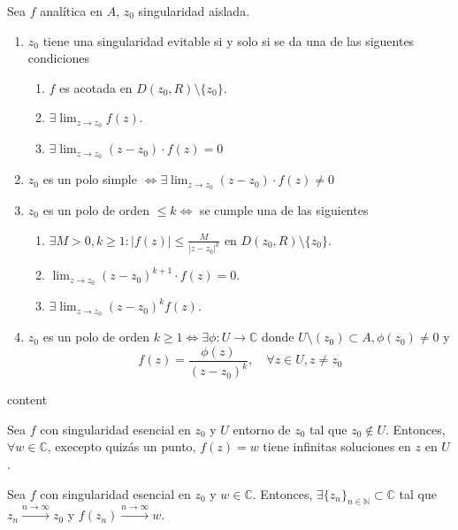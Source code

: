 \begin{prop}
  Sea $f$ analítica en $A$, $z_{0}$ singularidad aislada.
  \begin{enumerate}[label=(\roman*)]
    \item $z_{0}$ tiene una singularidad evitable si y solo si se da una de las siguentes condiciones
      \begin{enumerate}
        \item $f$ es acotada en $D(z_{0}, R) \setminus \{ z_{0} \}$.
        \item $\exists \lim_{z \to z_{0}} f(z)$.
        \item $\exists \lim_{z \to z_{0}} (z - z_{0}) \cdot f(z) = 0$
      \end{enumerate}
    \item $z_{0}$ es un polo simple $\Leftrightarrow \exists \lim_{z \to z_{0}} (z - z_{0}) \cdot f(z) \neq 0$
    \item $z_{0}$ es un polo de orden $\leq k \Leftrightarrow$ se cumple una de las siguientes
      \begin{enumerate}
        \item $\exists M > 0, k \geq 1 : | f(z) | \leq \frac{M}{| z -z_{0} |^{k}}$ en $D(z_{0}, R) \setminus \{ z_{0} \}$.
        \item $\lim_{z \to z_{0}} (z - z_{0})^{k+1} \cdot f(z) = 0$.
        \item $\exists \lim_{z \to z_{0}} (z -z_{0})^{k} f(z)$.
      \end{enumerate}
    \item $z_{0}$ es un polo de orden $k \geq 1 \Leftrightarrow \exists \phi : U \to \mathbb{C}$ donde $U \setminus (z_{0}) \subset A, \phi(z_{0}) \neq 0$ y
      \[ 
        f(z) = \frac{\phi(z)}{(z -z_{0})^{k}}, \quad \forall z \in U, z \neq z_{0}
      \] 
  \end{enumerate}
\end{prop}

\begin{dem}
  content
\end{dem}

\begin{theo}[de Picard]
  Sea $f$ con singularidad esencial en $z_{0}$ y $U$ entorno de $z_{0}$ tal que $z_{0} \not \in U$. Entonces, $\forall w \in \mathbb{C}$, execepto quizás un punto, $f(z) = w$ tiene infinitas soluciones en $z$ en $U$.
\end{theo}

\begin{theo}
  Sea $f$ con singularidad esencial en $z_{0}$ y $w \in \mathbb{C}$. Entonces, $\exists \{ z_{n} \}_{n \in \mathbb{N}} \subset \mathbb{C}$ tal que $z_{n} \xrightarrow[]{ n \rightarrow \infty } z_{0}$ y $f(z_{n}) \xrightarrow[]{ n \rightarrow \infty } w$.
\end{theo}
